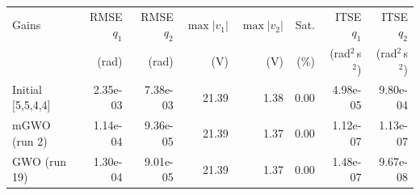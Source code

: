 \begin{tabular}{lrrrrrrr}
\toprule
Gains & RMSE $q_1$ & RMSE $q_2$ & $\max|v_1|$ & $\max|v_2|$ & Sat. & ITSE $q_1$ & ITSE $q_2$ \\
 & (rad) & (rad) & (V) & (V) & (\%) & (rad$^2$\,s$^2$) & (rad$^2$\,s$^2$) \\
\midrule
Initial [5,5,4,4] & 2.35e-03 & 7.38e-03 & 21.39 & 1.38 & 0.00 & 4.98e-05 & 9.80e-04 \\
mGWO (run 2) & 1.14e-04 & 9.36e-05 & 21.39 & 1.37 & 0.00 & 1.12e-07 & 1.13e-07 \\
GWO (run 19) & 1.30e-04 & 9.01e-05 & 21.39 & 1.37 & 0.00 & 1.48e-07 & 9.67e-08 \\
\bottomrule
\end{tabular}
